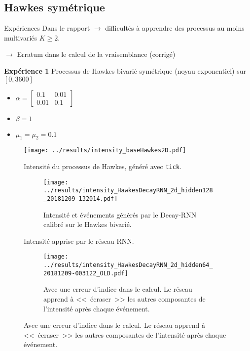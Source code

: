 \documentclass[../main.tex]{subfiles}
\begin{document}
\subsection{Hawkes symétrique}

\begin{frame}{Expériences}
Dans le rapport $\rightarrow$ difficultés à apprendre des processus au moins multivariés $K\geq 2$.\pause

$\rightarrow$ Erratum dans le calcul de la vraisemblance (corrigé)

\textbf{Expérience 1} Processus de Hawkes bivarié symétrique (noyau exponentiel) sur $[0, 3600]$
\begin{itemize}
	\item $\alpha = \begin{bmatrix}0.1 & 0.01 \\ 0.01 & 0.1\end{bmatrix}$
	\item $\beta = 1$
	\item $\mu_1 = \mu_2 = \num{0.1}$
\end{itemize}
\end{frame}

\begin{frame}

\begin{figure}
	\texttt{[image: ../results/intensity\_baseHawkes2D.pdf]}
	\caption{Intensité du processus de Hawkes, généré avec \texttt{tick}.}
\end{figure}
\end{frame}

\begin{frame}
\begin{figure}
\begin{subfigure}{\linewidth}
	\texttt{[image: ../results/intensity\_HawkesDecayRNN\_2d\_hidden128\_20181209-132014.pdf]}
	\caption{Intensité et événements générés par le Decay-RNN calibré sur le Hawkes bivarié.}
\end{subfigure}
	\caption{Intensité apprise par le réseau RNN.}
\end{figure}
\end{frame}

\begin{frame}
\begin{figure}\ContinuedFloat
\begin{subfigure}{\linewidth}
	\texttt{[image: ../results/intensity\_HawkesDecayRNN\_2d\_hidden64\_20181209-003122\_OLD.pdf]}
	\caption{Avec une erreur d'indice dans le calcul. Le réseau apprend à <<~écraser~>> les autres composantes de l'intensité après chaque événement.}
\end{subfigure}
\end{figure}
\end{frame}
\end{document}
